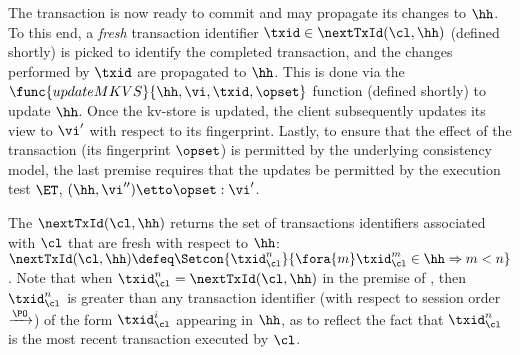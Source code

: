 The transaction is now ready to commit and may propagate its changes to $\hh$.
To this end, a \emph{fresh} transaction identifier $\txid \in \nextTxId(\cl, \hh)$ (defined shortly) is picked
to identify the completed transaction, and the changes performed by $\txid$ are propagated to $\hh$. 
This is done via the $\func{updateMKVS}{\hh, \vi, \txid, \opset}$ function (defined shortly) to update $\hh$. 
Once the kv-store is updated, the client subsequently updates its view to $\vi'$ with respect to its fingerprint. 
Lastly, to ensure that the effect of the transaction (its fingerprint  $\opset$) is permitted by the underlying consistency model, 
the last premise requires that the updates be permitted by the execution test $\ET$, \ie \( (\hh, \vi'') \etto \opset : \vi'\).

The $\nextTxId(\cl, \hh)$ returns the set of transactions identifiers associated with $\cl$ that are fresh with respect to $\hh$: 
$\nextTxId(\cl, \hh) \defeq \Setcon{\txid_{\cl}^{n}}{\fora{m} \txid_{\cl}^{m} \in \hh \Rightarrow m < n }$.
Note that when $\txid_\cl^n = \nextTxId(\cl, \hh)$ in the premise of , then $\txid_\cl^n$ is greater than any transaction identifier 
(with respect to session order $\xrightarrow{\PO}$) 
of the form $\txid_{\cl}^{i}$ appearing in $\hh$,
as to reflect the fact that $\txid_\cl^n$ is the most recent transaction executed by $\cl$.

